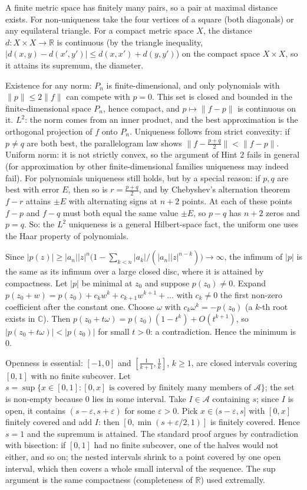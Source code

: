 \documentclass[11pt,a4paper]{article}
\begin{document}
 A finite metric space has finitely many pairs, so a pair at maximal distance exists. For non-uniqueness take the four vertices of a square (both diagonals) or any equilateral triangle.
 For a compact metric space $X$, the distance $d\colon X\times X\to\mathbb R$ is continuous (by the triangle inequality, $|d(x,y)-d(x',y')|\le d(x,x')+d(y,y')$) on the compact space $X\times X$, so it attains its supremum, the diameter.

 Existence for any norm: $P_n$ is finite-dimensional, and only polynomials with $\|p\|\le 2\|f\|$ can compete with $p=0$. This set is closed and bounded in the finite-dimensional space $P_n$, hence compact, and $p\mapsto\|f-p\|$ is continuous on it.
 $L^2$: the norm comes from an inner product, and the best approximation is the orthogonal projection of $f$ onto $P_n$. Uniqueness follows from strict convexity: if $p\ne q$ are both best, the parallelogram law shows $\|f-\frac{p+q}{2}\|<\|f-p\|$.
 Uniform norm: it is not strictly convex, so the argument of Hint 2 fails in general (for approximation by other finite-dimensional families uniqueness may indeed fail). For polynomials uniqueness still holds, but by a special reason: if $p,q$ are best with error $E$, then so is $r=\frac{p+q}{2}$, and by Chebyshev's alternation theorem $f-r$ attains $\pm E$ with alternating signs at $n+2$ points.
 At each of these points $f-p$ and $f-q$ must both equal the same value $\pm E$, so $p-q$ has $n+2$ zeros and $p=q$. So: the $L^2$ uniqueness is a general Hilbert-space fact, the uniform one uses the Haar property of polynomials.

 Since $|p(z)|\ge |a_n||z|^n\bigl(1-\sum_{k<n}|a_k|/(|a_n||z|^{n-k})\bigr)\to\infty$, the infimum of $|p|$ is the same as its infimum over a large closed disc, where it is attained by compactness.
 Let $|p|$ be minimal at $z_0$ and suppose $p(z_0)\ne0$. Expand $p(z_0+w)=p(z_0)+c_kw^k+c_{k+1}w^{k+1}+\dots$ with $c_k\ne0$ the first non-zero coefficient after the constant one.
 Choose $\omega$ with $c_k\omega^k=-p(z_0)$ (a $k$-th root exists in $\mathbb C$). Then $p(z_0+t\omega)=p(z_0)(1-t^k)+O(t^{k+1})$, so $|p(z_0+t\omega)|<|p(z_0)|$ for small $t>0$: a contradiction. Hence the minimum is $0$.

 Openness is essential: $[-1,0]$ and $[\frac1{k+1},\frac1k]$, $k\ge1$, are closed intervals covering $[0,1]$ with no finite subcover. Let $s=\sup\{x\in[0,1]: [0,x]\text{ is covered by finitely many members of }\mathcal A\}$; the set is non-empty because $0$ lies in some interval.
 Take $I\in\mathcal A$ containing $s$; since $I$ is open, it contains $(s-\varepsilon,s+\varepsilon)$ for some $\varepsilon>0$. Pick $x\in(s-\varepsilon,s]$ with $[0,x]$ finitely covered and add $I$: then $[0,\min(s+\varepsilon/2,1)]$ is finitely covered. Hence $s=1$ and the supremum is attained.
 The standard proof argues by contradiction with bisection: if $[0,1]$ had no finite subcover, one of the halves would not either, and so on; the nested intervals shrink to a point covered by one open interval, which then covers a whole small interval of the sequence. The sup argument is the same compactness (completeness of $\mathbb R$) used extremally.
\end{document}
